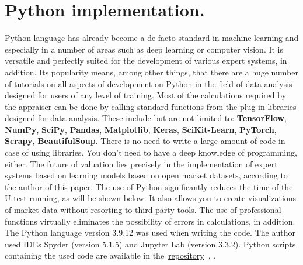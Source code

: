 \documentclass[]{scrreprt}
\begin{document}
\section{Python implementation.}\label{U-test-Python}
%
%
Python language has already become a de facto standard in machine learning and especially in a number of areas such as deep learning or computer vision. It is versatile and perfectly suited for the development of various expert systems, in addition. Its popularity means, among other things, that there are a huge number of tutorials on all aspects of development on Python in the field of data analysis designed for users of any level of training. Most of the calculations required by the appraiser can be done by calling standard functions from the plug-in libraries designed for data analysis. These include but are not limited to: \textbf{TensorFlow}, \textbf{NumPy}, \textbf{SciPy}, \textbf{Pandas}, \textbf{Matplotlib}, \textbf{Keras}, \textbf{SciKit-Learn}, \textbf{PyTorch}, \textbf{Scrapy}, \textbf{BeautifulSoup}. There is no need to write a large amount of code in case of using libraries. You don't need to have a deep knowledge of programming, either. The future of valuation lies precisely in the implementation of expert systems based on learning models based on open market datasets, according to the author of this paper. The use of Python significantly reduces the time of the U-test running, as will be shown below. It also allows you to create visualizations of market data without resorting to third-party tools. The use of professional functions virtually eliminates the possibility of errors in calculations, in addition. The Python language version 3.9.12 was used when writing the code. The author used IDEs Spyder (version 5.1.5) and Jupyter Lab (version 3.3.2). Python scripts containing the used code are available in the~\href{https://github.com/Kirill-Murashev/AI_for_valuers_Python_source/tree/main/Mann-Whitney-u-test}{repository}~\cite{Murashev:U-test.py}, \cite{Murashev:U-test.ipynb}.
\end{document}

